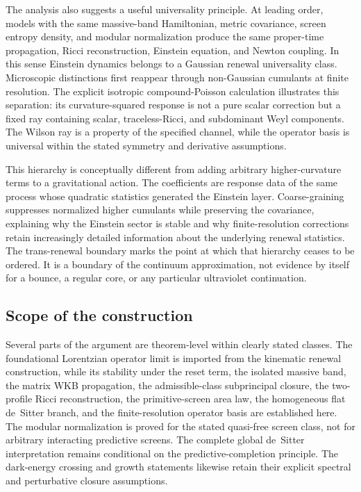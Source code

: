 \documentclass[11pt]{article}
\theoremstyle{definition}
\theoremstyle{remark}
\begin{document}
The analysis also suggests a useful universality principle.  At leading order, models with the same massive-band Hamiltonian, metric covariance, screen entropy density, and modular normalization produce the same proper-time propagation, Ricci reconstruction, Einstein equation, and Newton coupling.  In this sense Einstein dynamics belongs to a Gaussian renewal universality class.  Microscopic distinctions first reappear through non-Gaussian cumulants at finite resolution.  The explicit isotropic compound-Poisson calculation illustrates this separation: its curvature-squared response is not a pure scalar correction but a fixed ray containing scalar, traceless-Ricci, and subdominant Weyl components.  The Wilson ray is a property of the specified channel, while the operator basis is universal within the stated symmetry and derivative assumptions.

This hierarchy is conceptually different from adding arbitrary higher-curvature terms to a gravitational action.  The coefficients are response data of the same process whose quadratic statistics generated the Einstein layer.  Coarse-graining suppresses normalized higher cumulants while preserving the covariance, explaining why the Einstein sector is stable and why finite-resolution corrections retain increasingly detailed information about the underlying renewal statistics.  The trans-renewal boundary marks the point at which that hierarchy ceases to be ordered.  It is a boundary of the continuum approximation, not evidence by itself for a bounce, a regular core, or any particular ultraviolet continuation.

\subsection{Scope of the construction}

Several parts of the argument are theorem-level within clearly stated classes.  The foundational Lorentzian operator limit is imported from the kinematic renewal construction, while its stability under the reset term, the isolated massive band, the matrix WKB propagation, the admissible-class subprincipal closure, the two-profile Ricci reconstruction, the primitive-screen area law, the homogeneous flat de~Sitter branch, and the finite-resolution operator basis are established here.  The modular normalization is proved for the stated quasi-free screen class, not for arbitrary interacting predictive screens.  The complete global de~Sitter interpretation remains conditional on the predictive-completion principle.  The dark-energy crossing and growth statements likewise retain their explicit spectral and perturbative closure assumptions.
\end{document}
